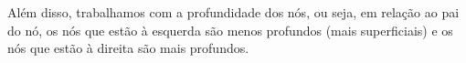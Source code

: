 

Além disso, trabalhamos com a profundidade dos nós, ou seja, em relação ao pai do nó, os nós que estão à esquerda são menos profundos (mais superficiais) e os nós que estão à direita são mais profundos.  

\newpage
